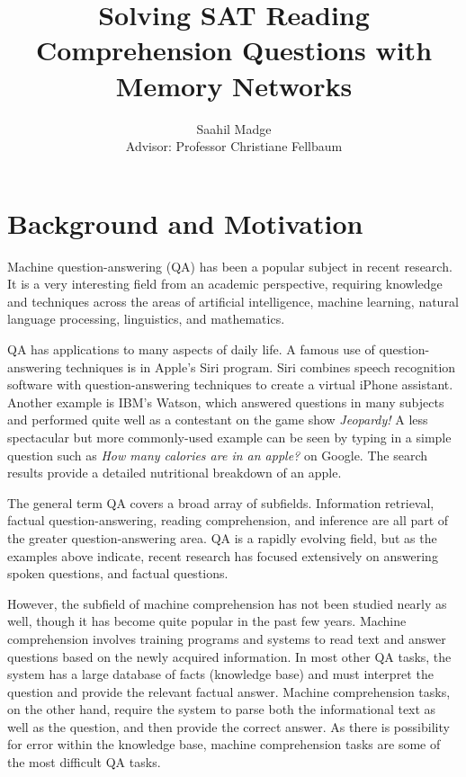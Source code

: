 \documentclass[pageno]{final_paper}
\begin{document}
\title{
Solving SAT Reading Comprehension Questions with Memory Networks}

\author{Saahil Madge\\Advisor: Professor Christiane Fellbaum}

\date{}
\maketitle

\thispagestyle{empty}
\doublespacing

\section{Background and Motivation}
\label{Background and Motivation}

Machine question-answering (QA) has been a popular subject in recent research.
It is a very interesting field from an academic perspective, requiring
knowledge and techniques across the areas of artificial intelligence, machine
learning, natural language processing, linguistics, and mathematics.

QA has applications to many aspects of daily life. A famous use of
question-answering techniques is in Apple's Siri program. Siri combines speech
recognition software with question-answering techniques to create a virtual
iPhone assistant. Another example is IBM's Watson, which answered questions in
many subjects and performed quite well as a contestant on the game show
\textit{Jeopardy!} A less spectacular but more commonly-used example can be seen
by typing in a simple question such as \textit{How many calories are in an
apple?} on Google. The search results provide a detailed nutritional breakdown
of an apple.

The general term QA covers a broad array of subfields. Information retrieval,
factual question-answering, reading comprehension, and inference are all part
of the greater question-answering area. QA is a rapidly evolving field, but as
the examples above indicate, recent research has focused extensively on
answering spoken questions, and factual questions.

However, the subfield of machine comprehension has not been studied nearly as
well, though it has become quite popular in the past few years. Machine
comprehension involves training programs and systems to read text and answer
questions based on the newly acquired information. In most other QA tasks, the
system has a large database of facts (knowledge base) and must interpret the
question and provide the relevant factual answer. Machine comprehension tasks,
on the other hand, require the system to parse both the informational text as
well as the question, and then provide the correct answer. As there is
possibility for error within the knowledge base, machine comprehension tasks
are some of the most difficult QA tasks.
\end{document}
